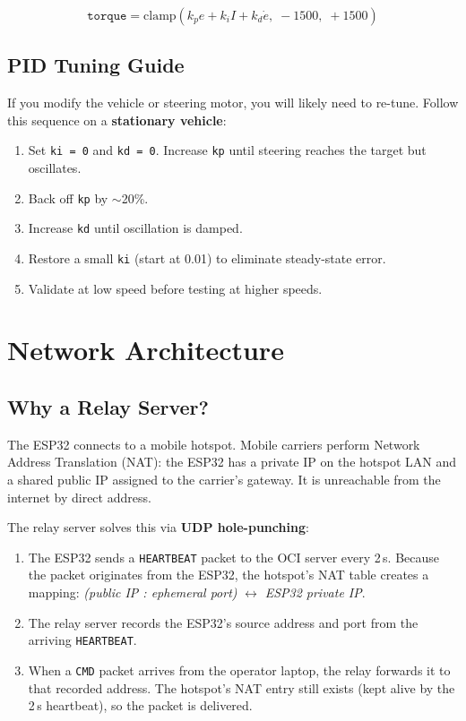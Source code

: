 \documentclass[12pt, letterpaper]{article}
\begin{document}
\[
  \texttt{torque} = \text{clamp}\!\left(
    k_p e + k_i I + k_d \dot{e},\;
    -1500,\; +1500
  \right)
\]

\subsection{PID Tuning Guide}

If you modify the vehicle or steering motor, you will likely need to re-tune.
Follow this sequence on a \textbf{stationary vehicle}:

\begin{enumerate}
  \item Set \texttt{ki = 0} and \texttt{kd = 0}.  Increase \texttt{kp} until
        steering reaches the target but oscillates.
  \item Back off \texttt{kp} by $\sim$20\%.
  \item Increase \texttt{kd} until oscillation is damped.
  \item Restore a small \texttt{ki} (start at 0.01) to eliminate steady-state error.
  \item Validate at low speed before testing at higher speeds.
\end{enumerate}

\section{Network Architecture}

\subsection{Why a Relay Server?}

The ESP32 connects to a mobile hotspot.  Mobile carriers perform Network Address
Translation (NAT): the ESP32 has a private IP on the hotspot LAN and a shared
public IP assigned to the carrier's gateway.  It is unreachable from the internet
by direct address.

The relay server solves this via \textbf{UDP hole-punching}:

\begin{enumerate}
  \item The ESP32 sends a \texttt{HEARTBEAT} packet to the OCI server every 2\,s.
        Because the packet originates from the ESP32, the hotspot's NAT table
        creates a mapping: \textit{(public IP : ephemeral port)} $\leftrightarrow$
        \textit{ESP32 private IP}.
  \item The relay server records the ESP32's source address and port from the
        arriving \texttt{HEARTBEAT}.
  \item When a \texttt{CMD} packet arrives from the operator laptop, the relay
        forwards it to that recorded address.  The hotspot's NAT entry still
        exists (kept alive by the 2\,s heartbeat), so the packet is delivered.
\end{enumerate}
\end{document}
